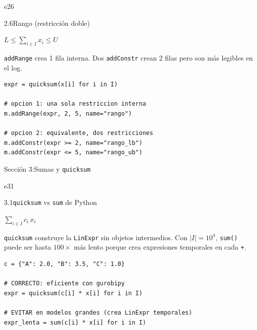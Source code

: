 \documentclass[10pt,a4paper]{article}
\newlength{\mathcolw}
\newlength{\codecolw}
\newcommand{\secheader}[2]{%
  \vspace{10pt}%
  \needspace{6cm}%
  \phantomsection\hypertarget{sec#1}{}%
  \noindent%
  \begin{tcolorbox}[
    colback=sectionbg, colupper=white,
    colframe=sectionbg, sharp corners,
    left=8pt, right=8pt, top=5pt, bottom=5pt,
    fontupper=\large\bfseries\sffamily,
  ]
  Secci\'on #1:\enspace #2
  \end{tcolorbox}%
  \vspace{2pt}%
}
\newcommand{\entryheader}[2][]{%
  \needspace{5cm}%
  \vspace{6pt}%
  \ifx\relax#1\relax\else\phantomsection\hypertarget{#1}{}\fi%
  \noindent%
  \begin{tcolorbox}[
    colback=subsecbg!18,
    colframe=subsecbg!45,
    sharp corners, boxrule=0.4pt,
    left=5pt, right=5pt, top=2pt, bottom=2pt,
    fontupper=\small\bfseries\sffamily,
  ]
  #2
  \end{tcolorbox}%
  \vspace{2pt}%
}
\newcommand{\py}[1]{\texttt{\small #1}}
\begin{document}
\entryheader[e26]{2.6\quad Rango (restricci\'on doble)}
\noindent
\begin{minipage}[t]{\mathcolw}
    \begin{tcolorbox}[mathbox]
        $L \leq \displaystyle\sum_{i \in I} x_i \leq U$
    \end{tcolorbox}
    \vspace{2pt}
    \begin{tcolorbox}[notebox]
        \py{addRange} crea 1 fila interna. Dos \py{addConstr} crean 2 filas pero son m\'as legibles en el log.
    \end{tcolorbox}
\end{minipage}\hspace{0.02\textwidth}%
\begin{minipage}[t]{\codecolw}
    \begin{lstlisting}[style=gurobipy]
expr = quicksum(x[i] for i in I)

# opcion 1: una sola restriccion interna
m.addRange(expr, 2, 5, name="rango")

# opcion 2: equivalente, dos restricciones
m.addConstr(expr >= 2, name="rango_lb")
m.addConstr(expr <= 5, name="rango_ub")
\end{lstlisting}
\end{minipage}

\vspace{4pt}

\secheader{3}{Sumas y \texttt{quicksum}}

\entryheader[e31]{3.1\quad \py{quicksum} vs \py{sum} de Python}
\noindent
\begin{minipage}[t]{\mathcolw}
    \begin{tcolorbox}[mathbox]
        $\displaystyle\sum_{i \in I} c_i\, x_i$
    \end{tcolorbox}
    \vspace{2pt}
    \begin{tcolorbox}[notebox]
        \py{quicksum} construye la \py{LinExpr} sin objetos intermedios. Con $|I|=10^4$, \py{sum()} puede ser hasta $100\times$ m\'as lento porque crea expresiones temporales en cada \py{+}.
    \end{tcolorbox}
\end{minipage}\hspace{0.02\textwidth}%
\begin{minipage}[t]{\codecolw}
    \begin{lstlisting}[style=gurobipy]
c = {"A": 2.0, "B": 3.5, "C": 1.0}

# CORRECTO: eficiente con gurobipy
expr = quicksum(c[i] * x[i] for i in I)

# EVITAR en modelos grandes (crea LinExpr temporales)
expr_lenta = sum(c[i] * x[i] for i in I)
\end{lstlisting}
\end{minipage}
\end{document}
